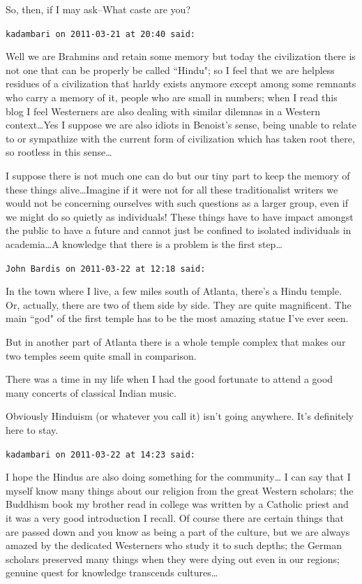 \begin{footnotesize}
\begin{sffamily}
So, then, if I may ask–What caste are you?


\hfill

\texttt{kadambari on 2011-03-21 at 20:40 said: }

Well we are Brahmins and retain some memory but today the civilization there is not one that can be properly be called ``Hindu"; so I feel that we are helpless residues of a civilization that harldy exists anymore except among some remnants who carry a memory of it, people who are small in numbers; when I read this blog I feel Westerners are also dealing with similar dilemnas in a Western context…Yes I suppose we are also idiots in Benoist's sense, being unable to relate to or sympathize with the current form of civilization which has taken root there, so rootless in this sense…

I suppose there is not much one can do but our tiny part to keep the memory of these things alive…Imagine if it were not for all these traditionalist writers we would not be concerning ourselves with such questions as a larger group, even if we might do so quietly as individuals! These things have to have impact amongst the public to have a future and cannot just be confined to isolated individuals in academia…A knowledge that there is a problem is the first step…


\hfill

\texttt{John Bardis on 2011-03-22 at 12:18 said: }

In the town where I live, a few miles south of Atlanta, there's a Hindu temple. Or, actually, there are two of them side by side. They are quite magnificent. The main ``god" of the first temple has to be the most amazing statue I've ever seen.

But in another part of Atlanta there is a whole temple complex that makes our two temples seem quite small in comparison.

There was a time in my life when I had the good fortunate to attend a good many concerts of classical Indian music.

Obviously Hinduism (or whatever you call it) isn't going anywhere. It's definitely here to stay.


\hfill

\texttt{kadambari on 2011-03-22 at 14:23 said: }

I hope the Hindus are also doing something for the community… I can say that I myself know many things about our religion from the great Western scholars; the Buddhism book my brother read in college was written by a Catholic priest and it was a very good introduction I recall. Of course there are certain things that are passed down and you know as being a part of the culture, but we are always amazed by the dedicated Westerners who study it to such depths; the German scholars preserved many things when they were dying out even in our regions; genuine quest for knowledge transcends cultures…


\end{sffamily}
\end{footnotesize}
